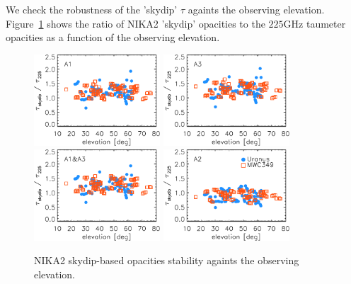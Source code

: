 We check the robustness of the 'skydip' $\tau$ againts the
observing elevation. 
Figure~\ref{fig:skydip-to-taumeter-ratio-vs-elev} shows the ratio of NIKA2
'skydip' opacities to the $225$GHz taumeter opacities as a function of
the observing elevation.

\begin{figure}[ht!]
  \begin{center}
    \includegraphics[clip=true, trim={0, -0.3cm, -0.3cm, 0}, width=0.42\textwidth]{Figures/Opacity/Opacity_skydip_to_taumeter_vs_elev_a1.pdf}
    \includegraphics[clip=true, trim={0, -0.3cm, -0.3cm, 0}, width=0.42\textwidth]{Figures/Opacity/Opacity_skydip_to_taumeter_vs_elev_a3.pdf}
    \includegraphics[clip=true, trim={0, -0.3cm, -0.3cm, 0}, width=0.42\textwidth]{Figures/Opacity/Opacity_skydip_to_taumeter_vs_elev_1mm.pdf}
    \includegraphics[clip=true, trim={0, -0.3cm, -0.3cm, 0}, width=0.42\textwidth]{Figures/Opacity/Opacity_skydip_to_taumeter_vs_elev_a2.pdf}
    \caption[NIKA2 skydip-based opacity stability against observing elevations]{NIKA2
    skydip-based opacities stability againts the observing elevation.} 
\label{fig:skydip-to-taumeter-ratio-vs-elev}
\end{center}
\end{figure}




